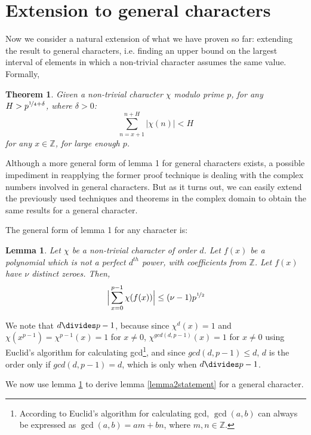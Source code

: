 \documentclass{report}
\newtheorem{lemma}{Lemma}
\newtheorem{theorem}{Theorem}
\begin{document}
\section{Extension to general characters}
%
%
Now we consider a natural extension of what we have proven so far: extending the result to general characters, i.e. finding an upper bound on the largest interval of elements in which a non-trivial character assumes the same value. Formally,
\begin{theorem} \label{thm:genp4bound}
Given a non-trivial character $\chi$ modulo prime $p$, for any $H>p^{\nicefrac{1}{4}+\delta}$, where $\delta>0$:
\[\sum\limits_{n=x+1}^{n+H}\lvert\chi(n)\rvert<H\]
for any $x\in\mathbb{Z}$, for large enough $p$.
\end{theorem}
Although a more general form of lemma 1 for general characters exists, a possible impediment in reapplying the former proof technique is dealing with the complex numbers involved in general characters. But as it turns out, we can easily extend the previously used techniques and theorems in the complex domain to obtain the same results for a general character.

The general form of lemma 1 for any character is:
\begin{lemma} \label{lemma4}
\textup{\cite{schmidt}}Let $\chi$ be a non-trivial character of order $d$. Let $f(x)$ be a polynomial which is not a perfect $d^{th}$ power, with coefficients from $\mathbb{Z}$. Let $f(x)$ have $\nu$ distinct zeroes. Then,
$$\Big\lvert\sum\limits_{x=0}^{p-1}\chi(f(x))\Big\rvert\leq (\nu -1)p^{\nicefrac{1}{2}}$$
\end{lemma}
We note that $d \divides p-1$, because since $\chi^{d}(x)=1$ and $\chi(x^{p-1})=\chi^{p-1}(x)=1$ for $x\neq0$, $\chi^{gcd(d,p-1)}(x)=1$ for $x\neq0$ using Euclid's algorithm for calculating gcd\footnote{According to Euclid's algorithm for calculating gcd, $\gcd(a,b)$ can always be expressed as $\gcd(a,b)=am+bn$, where $m,n\in \mathbb{Z}$.}, and since $gcd(d,p-1)\leq d$, $d$ is the order only if $gcd(d,p-1) = d$, which is only when $d \divides p-1$.

We now use lemma \ref{lemma4} to derive lemma \ref{lemma2statement} for a general character.
\end{document}
